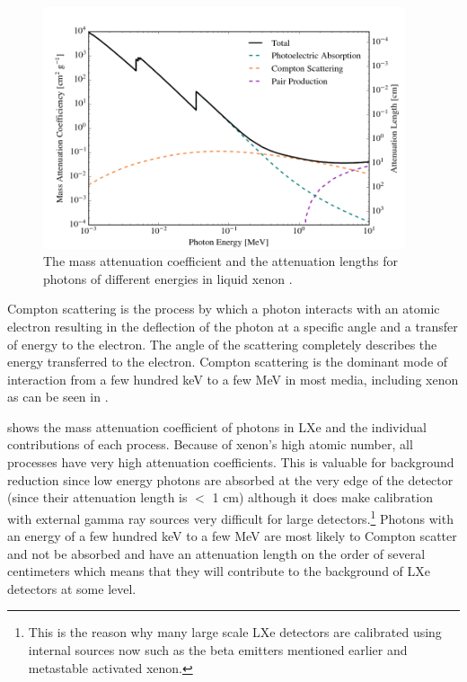 \begin{figure}[t]
	\centering
	\includegraphics[width=0.95\textwidth]{photon_attenuation}
	\caption{The mass attenuation coefficient and the attenuation lengths for photons of different energies in liquid xenon \cite{berger8coll}.}
	\label{fig:photon_attenuation}
\end{figure}

Compton scattering is the process by which a photon interacts with an atomic electron resulting in the deflection of the photon at a specific angle and a transfer of energy to the electron.  The angle of the scattering completely describes the energy transferred to the electron.  Compton scattering is the dominant mode of interaction from a few hundred keV to a few MeV in most media, including xenon as can be seen in .

 shows the mass attenuation coefficient of photons in LXe and the individual contributions of each process.  Because of xenon's high atomic number, all processes have very high attenuation coefficients.  This is valuable for background reduction since low energy photons are absorbed at the very edge of the detector (since their attenuation length is $<$ 1 cm) although it does make calibration with external gamma ray sources very difficult for large detectors.\footnote{This is the reason why many large scale LXe detectors are calibrated using internal sources now such as the beta emitters mentioned earlier and metastable activated xenon.}  Photons with an energy of a few hundred keV to a few MeV are most likely to Compton scatter and not be absorbed and have an attenuation length on the order of several centimeters which means that they will contribute to the background of LXe detectors at some level.
 

